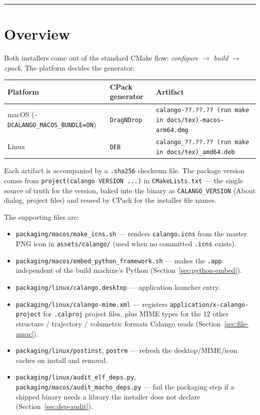 \documentclass[11pt,a4paper]{article}
\newcommand{\file}[1]{\texttt{#1}}
\newcommand{\opt}[1]{\texttt{#1}}
\newcommand{\calangoversion}{??.??.?? (run make in docs/tex)}%
\begin{document}
\tableofcontents
\bigskip
\hrule

\section{Overview}

Both installers come out of the standard CMake flow: \emph{configure}
$\to$ \emph{build} $\to$ \emph{cpack}. The platform decides the generator:

\begin{center}
\small
\begin{tabular}{@{}lll@{}}
\toprule
Platform & CPack generator & Artifact \\
\midrule
macOS (\opt{-DCALANGO\_MACOS\_BUNDLE=ON}) & \opt{DragNDrop} &
\file{calango-\calangoversion-macos-arm64.dmg} \\
Linux & \opt{DEB} & \file{calango\_\calangoversion\_amd64.deb} \\
\bottomrule
\end{tabular}
\end{center}

Each artifact is accompanied by a \file{.sha256} checksum file. The
package version comes from \opt{project(calango VERSION ...)} in
\file{CMakeLists.txt} --- the single source of truth for the version,
baked into the binary as \opt{CALANGO\_VERSION} (About dialog, project
files) and reused by CPack for the installer file names.

The supporting files are:

\begin{itemize}[itemsep=2pt]
  \item \file{packaging/macos/make\_icns.sh} --- renders
        \file{calango.icns} from the master PNG icon in
        \file{assets/calango/} (used when no committed \file{.icns}
        exists).
  \item \file{packaging/macos/embed\_python\_framework.sh} --- makes the
        \file{.app} independent of the build machine's Python
        (Section~\ref{sec:python-embed}).
  \item \file{packaging/linux/calango.desktop} --- application launcher entry.
  \item \file{packaging/linux/calango-mime.xml} --- registers
        \texttt{application/x-calango-project} for \file{.calproj}
        project files, plus MIME types for the 12 other structure /
        trajectory / volumetric formats Calango reads (Section~\ref{sec:file-assoc}).
  \item \file{packaging/linux/postinst}, \file{postrm} --- refresh the
        desktop/MIME/icon caches on install and removal.
  \item \file{packaging/linux/audit\_elf\_deps.py},
        \file{packaging/macos/audit\_macho\_deps.py} --- fail the
        packaging step if a shipped binary needs a library the
        installer does not declare (Section~\ref{sec:dep-audit}).
\end{itemize}
\end{document}

